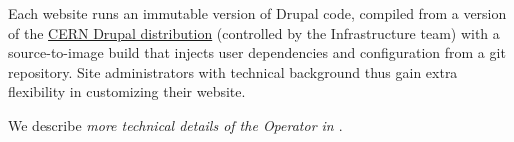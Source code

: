 Each website runs an immutable version of Drupal code, compiled from a version of the \href{https://gitlab.cern.ch/drupal/paas/cern-drupal-distribution/}{CERN Drupal distribution}
(controlled by the Infrastructure team) with a source-to-image build that injects user dependencies and configuration from a git repository.
Site administrators with technical background thus gain extra flexibility in customizing their website.


We describe \emph{more technical details of the Operator in \cite{kubeconCernOperators}}.